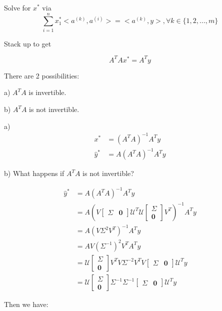 Solve for $x^*$ via
\begin{equation*}
\sum^n_{i=1}x_1^*<a^{(k)}, a^{(i)}> = <a^{(k)}, y>, \forall k \in \{1,2,...,m \}
\end{equation*}

Stack up to get 

\begin{equation*}
A^TAx^* = A^Ty
\end{equation*}

There are 2 possibilities:

a) $A^TA$ is invertible.

b) $A^TA$ is not invertible.

a) 
\begin{align*}
x^* &= (A^TA)^{-1}A^Ty\\
\hat{y}^* &= A(A^TA)^{-1}A^Ty
\end{align*}

b) What happens if $A^TA$ is not invertible? 

\begin{align*}
\hat{y}^* &= A(A^TA)^{-1}A^Ty\\
&= A(V
\begin{bmatrix}
\Sigma & \textbf{0}
\end{bmatrix}
\mathcal{U}^T\mathcal{U}
\begin{bmatrix}
\Sigma \\
\textbf{0}
\end{bmatrix}
V^T)^{-1}A^Ty\\
&= A(V\Sigma^2V^T)^{-1}A^Ty\\
&= AV(\Sigma^{-1})^2V^TA^Ty\\
&= \mathcal{U}
\begin{bmatrix}
\Sigma \\
\textbf{0}
\end{bmatrix}
V^TV\Sigma^{-2}V^TV
\begin{bmatrix}
\Sigma & \textbf{0}
\end{bmatrix}
\mathcal{U}^Ty\\
&= \mathcal{U}
\begin{bmatrix}
\Sigma \\
\textbf{0}
\end{bmatrix}
\Sigma^{-1}\Sigma^{-1}
\begin{bmatrix}
\Sigma & \textbf{0}
\end{bmatrix}
\mathcal{U}^Ty
\end{align*}

Then we have:

